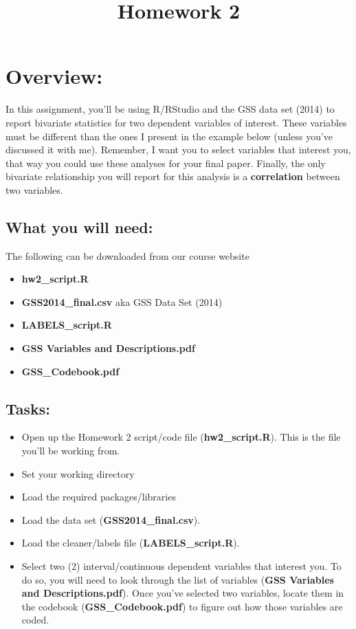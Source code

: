\documentclass{article}
\begin{document}
\title{Homework 2}
\author[*]{}
\date{}
\maketitle



\section*{Overview:}
In this assignment, you'll be using R/RStudio and the GSS data set (2014) to report bivariate statistics for two dependent variables of interest. These variables must be different than the ones I present in the example below (unless you've discussed it with me). Remember, I want you to select variables that interest you, that way you could use these analyses for your final paper. Finally, the only bivariate relationship you will report for this analysis is a {\bf{correlation}} between two variables.

\subsection*{What you will need:}
The following can be downloaded from our course website
\begin{itemize}
\item \textbf{hw2\_script.R}
\item \textbf{GSS2014\_final.csv} aka GSS Data Set (2014)
\item \textbf{LABELS\_script.R}
\item \textbf{GSS Variables and Descriptions.pdf}
\item \textbf{GSS\_Codebook.pdf}
\end{itemize}


\subsection*{Tasks:}
\begin{itemize}
\item Open up the Homework 2 script/code file (\textbf{hw2\_script.R}). This is the file you'll be working from.
\item Set your working directory
\item Load the required packages/libraries
\item Load the data set (\textbf{GSS2014\_final.csv}).
\item Load the cleaner/labels file (\textbf{LABELS\_script.R}).
\item Select two (2) interval/continuous dependent variables that interest you. To do so, you will need to look through the list of variables (\textbf{GSS Variables and Descriptions.pdf}). Once you've selected two variables, locate them in the codebook (\textbf{GSS\_Codebook.pdf}) to figure out how those variables are coded.
\end{itemize}
\end{document}
